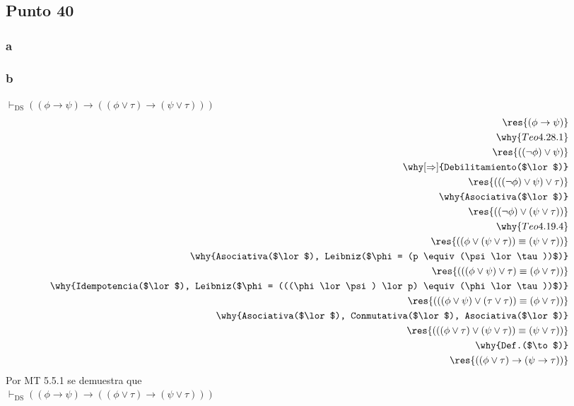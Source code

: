 \documentclass{article}
\begin{document}
\subsection{Punto 40}
\subsubsection{a}
\subsubsection{b}
\begin{logicenv}[5]{$\vdash_\text{DS} ((\phi \to \psi) \to ((\phi \lor \tau) \to (\psi \lor \tau)))$}
    \begin{align*}
            \res{(\phi \to \psi)}\\
        \why{Teo 4.28.1}\\
            \res{((\neg \phi) \lor \psi)}\\
        \why[\Rightarrow]{Debilitamiento($\lor$)}\\
            \res{(((\neg \phi) \lor \psi) \lor \tau)}\\
        \why{Asociativa($\lor$)}\\
            \res{((\neg \phi) \lor (\psi \lor \tau))}\\
        \why{Teo 4.19.4}\\
            \res{((\phi \lor (\psi \lor \tau)) \equiv (\psi \lor \tau))}\\
        \why{Asociativa($\lor$), Leibniz($\phi = (p \equiv (\psi \lor \tau))$)}\\
            \res{(((\phi \lor \psi) \lor \tau) \equiv (\phi \lor \tau))}\\
        \why{Idempotencia($\lor$), Leibniz($\phi = (((\phi \lor \psi) \lor p) \equiv (\phi \lor \tau))$)}\\
            \res{(((\phi \lor \psi) \lor (\tau \lor \tau)) \equiv (\phi \lor \tau))}\\
        \why{Asociativa($\lor$), Conmutativa($\lor$), Asociativa($\lor$)}\\
            \res{(((\phi \lor \tau) \lor (\psi \lor \tau)) \equiv (\psi \lor \tau))}\\
        \why{Def.($\to$)}\\
            \res{((\phi \lor \tau) \to (\psi \to \tau))}
    \end{align*}
    Por MT 5.5.1 se demuestra que\\
    $\vdash_\text{DS} ((\phi \to \psi) \to ((\phi \lor \tau) \to (\psi \lor \tau)))$
\end{logicenv}
\end{document}
